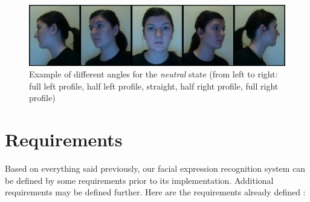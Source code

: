\begin{figure}[!h]
\begin{center}
\noindent \includegraphics[scale=0.3]{figures/example_angle} 
\newline
\caption{Example of different angles for the \textit{neutral} state (from left to right: full left profile, half left profile, straight, half right profile, full right profile)}
\label{example_angle}
\end{center} 
\end{figure}

\section{Requirements}

\vspace{\baselineskip}
\noindent Based on everything said previously, our facial expression recognition system can be defined by some requirements prior to its implementation. Additional requirements may be defined further. Here are the requirements already defined :
\newline


